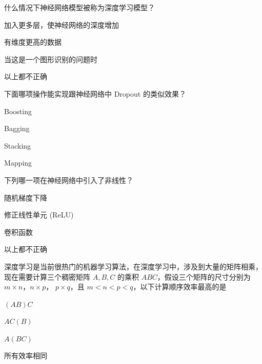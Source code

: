 \documentclass{exam-zh}
\title{}
\begin{document}
\maketitle


\begin{question}[points = 2]
	什么情况下神经网络模型被称为深度学习模型？ \paren[A]

	\begin{choices}
		\item 加入更多层，使神经网络的深度增加
		\item 有维度更高的数据
		\item 当这是一个图形识别的问题时
		\item 以上都不正确
	\end{choices}
\end{question}

\begin{question}
	下面哪项操作能实现跟神经网络中 Dropout 的类似效果？ \paren[B]
	\begin{choices}
		\item Boosting
		\item Bagging
		\item Stacking
		\item Mapping
	\end{choices}
\end{question}

\begin{question}
	下列哪一项在神经网络中引入了非线性？ \paren[B]
	\begin{choices}
		\item 随机梯度下降 
		\item 修正线性单元 (ReLU) 
		\item 卷积函数 
		\item 以上都不正确
	\end{choices}
\end{question}

\begin{question}
	深度学习是当前很热门的机器学习算法，在深度学习中，涉及到大量的矩阵相乘，现在需要计算三个稠密矩阵 $A, B, C$ 的乘积 $ABC$，假设三个矩阵的尺寸分别为 $m \times n$，$n \times p$， $p \times q$，且 $m < n < p < q$，以下计算顺序效率最高的是\paren[A]
	\begin{choices}
		\item $(AB)C$
		\item $AC(B)$
		\item $A(BC)$
		\item 所有效率相同
	\end{choices}
\end{question}
\end{document}
